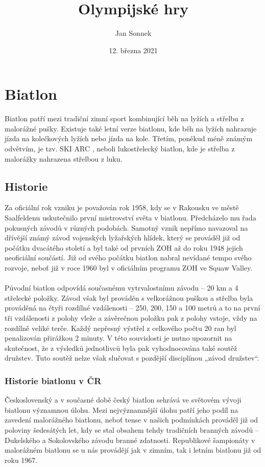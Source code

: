 \documentclass{article}
\title{Olympijské hry}
\author{Jan Sonnek}
\date{12. března 2021}
\begin{document}
\maketitle

\section{Biatlon}
Biatlon patří mezi tradiční zimní sport kombinující běh na lyžích a střelbu z malorážné pušky. Existuje také letní verze biatlonu, kde běh na lyžích nahrazuje jízda na kolečkových lyžích nebo jízda na kole. Třetím, poněkud méně známým odvětvím, je tzv. SKI ARC , neboli lukostřelecký biatlon, kde je střelba z malorážky nahrazena střelbou z luku.



\subsection{Historie}
Za oficiální rok vzniku je považován rok 1958, kdy se v Rakousku ve městě Saalfeldenu uskutečnilo první mistrovství světa v biatlonu. Předcházelo mu řada   pokusných závodů v různých podobách. Samotný vznik nepřímo navazoval na dřívější známý závod vojenských lyžařských hlídek, který se prováděl již od počátku dvacátého století a byl také od prvních ZOH až do roku 1948 jejich neoficiální součástí. Již od svého počátku biatlon nabral nevídané tempo svého rozvoje, neboť již v roce 1960 byl v oficiálním programu ZOH ve Squaw Valley. \\
\\
Původní biatlon odpovídá současnému vytrvalostnímu závodu – 20 km a 4 střelecké položky. Závod však byl prováděn s velkorážnou puškou a střelba byla prováděná na čtyři rozdílné vzdálenosti – 250, 200, 150 a 100 metrů a to na první tři vzdálenosti z polohy vleže a závěrečnou položku pak z polohy vstoje, vždy na rozdílně veliké terče. Každý nepřesný výstřel z celkového počtu 20 ran byl penalizován přirážkou 2 minuty. V této souvislosti je nutno upozornit na skutečnost, že z výsledků jednotlivců byla pak vyhodnocována také soutěž družstev. Tuto soutěž nelze však slučovat s pozdější disciplínou „závod družstev“.

\subsubsection{Historie biatlonu v ČR}
Československý a v současné době český biatlon sehrává ve světovém vývoji biatlonu významnou úlohu. Mezi nejvýznamnější úlohu patří jeho podíl na zavedení malorážného biatlonu, neboť tense v našich podmínkách prováděl již od poloviny šedesátých let, kdy se stal obsahem tehdy tradičních branných závodů – Dukelského a Sokolovského závodu branné zdatnosti. Republikové šampionáty v malorážném biatlonu se u nás provádějí jak v zimním, tak i letním biatlonu již od roku 1967. 
\end{document}
